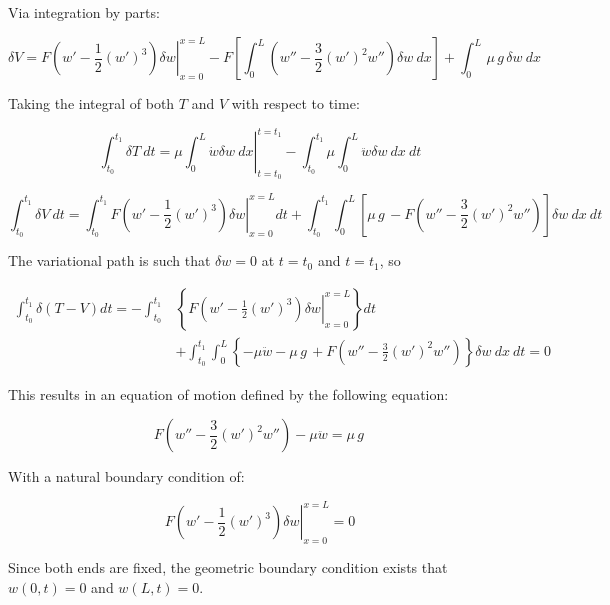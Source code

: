 \documentclass[12pt, letterpaper]{../assignment}
\begin{document}
Via integration by parts:


$$ \delta V = 
\left. F \left( w' - \frac{1}{2}(w')^3 \right)\delta w \right|_{x = 0}^{x = L}
- F \left[ \int_0^L \left( w'' - \frac{3}{2}(w')^2 w'' \right)\delta w\ dx \right] 
+ \int_0^L \,\mu\,g\,\delta w\ dx $$

Taking the integral of both $T$ and $V$ with respect to time:

$$ \int_{t_0}^{t_1} \delta T \ dt =
\left. \mu \int_0^L \dot{w} \delta w\ dx\right|_{t = t_0}^{t = t_1} 
- \int_{t_0}^{t_1}\mu \int_0^L \ddot{w} \delta w\ dx\ dt $$

$$ \int_{t_0}^{t_1} \delta V\ dt = 
\int_{t_0}^{t_1} \left. F \left( w' - \frac{1}{2}(w')^3 \right)\delta w \right|_{x = 0}^{x = L} dt
+ \int_{t_0}^{t_1} \int_0^L \left[ \mu\,g\, -F\left( w'' - \frac{3}{2}(w')^2 w'' \right) \right]\delta w\ dx\ dt $$

The variational path is such that $\delta w = 0$ at $t = t_0$ and $t = t_1$, so

\begin{equation*}
\begin{aligned}
\int_{t_0}^{t_1} \delta \left(T - V\right) dt =
- \int_{t_0}^{t_1} & \left\{\left. F \left( w' - \frac{1}{2}(w')^3 \right)\delta w \right|_{x = 0}^{x = L} \right\} dt \\
&+ \int_{t_0}^{t_1} \int_0^L \left\{ - \mu \ddot{w} -\mu\,g\, +F\left( w'' - \frac{3}{2}(w')^2 w'' \right) \right\}\delta w\ dx\ dt
= 0
\end{aligned}
\end{equation*}

This results in an equation of motion defined by the following equation:

\begin{answer}
$$  F\left( w'' - \frac{3}{2}(w')^2 w'' \right) - \mu \ddot{w} = \mu\,g\, $$
\end{answer}

With a natural boundary condition of:

\begin{answer}
  $$ \left. F \left( w' - \frac{1}{2}(w')^3 \right)\delta w \right|_{x = 0}^{x = L} = 0 $$
\end{answer}

\begin{answer}
Since both ends are fixed,
the geometric boundary condition exists that $w(0,t) = 0$ and $w(L,t) = 0$.
\end{answer}
\end{document}
